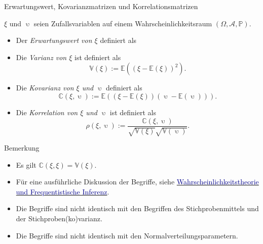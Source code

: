 \documentclass[
  8pt,
  ignorenonframetext,
]{beamer}
\providecommand{\tightlist}{%
  \setlength{\itemsep}{0pt}\setlength{\parskip}{0pt}}
\DeclareMathOperator*{\intinf}{\int_{-\infty}^{\infty}}
\DeclareMathOperator*{\ups}{\upsilon}
\begin{document}
\begin{frame}{Erwartungswert, Kovarianzmatrizen und
Korrelationsmatrizen}
\protect\hypertarget{erwartungswert-kovarianzmatrizen-und-korrelationsmatrizen}{}
\footnotesize
\begin{definition}
$\xi$ und $\ups$ seien Zufallsvariablen auf einem Wahrscheinlichkeitsraum $(\Omega, \mathcal{A}, \mathbb{P})$.
\begin{itemize}
\item Der \textit{Erwartungswert von $\xi$} definiert als
\begin{itemize}
\end{itemize}
\item Die \textit{Varianz von $\xi$} ist definiert als
\begin{equation}
\mathbb{V}(\xi) := \mathbb{E}\left((\xi - \mathbb{E}(\xi))^2\right).
\end{equation}
\item Die \textit{Kovarianz von $\xi$ und $\ups$} definiert als
\begin{equation}
\mathbb{C}(\xi,\ups) :=
\mathbb{E}\left(\left(\xi - \mathbb{E}(\xi) \right)\left(\ups - \mathbb{E}(\ups)\right)\right).
\end{equation}
\item Die \textit{Korrelation von $\xi$ und $\ups$} ist definiert als
\begin{equation}
\rho(\xi,\ups)
:= \frac{\mathbb{C}(\xi,\ups)}{\sqrt{\mathbb{V}(\xi)}\sqrt{\mathbb{V}(\ups)}}.
\end{equation}
\end{itemize}
\end{definition}
\vspace{-2mm}

Bemerkung \vspace{-2mm}

\begin{itemize}
\tightlist
\item
  Es gilt \(\mathbb{C}(\xi,\xi) = \mathbb{V}(\xi)\).
\item
  Für eine ausführliche Diskussion der Begriffe, siehe
  \href{https://bit.ly/3yT42Sj}{\textcolor{darkblue}{Wahrscheinlichkeitstheorie und Frequentistische Inferenz}}.
\item
  Die Begriffe sind nicht identisch mit den Begriffen des
  Stichprobenmittels und der Stichproben(ko)varianz.
\item
  Die Begriffe sind nicht identisch mit den Normalverteilungsparametern.
\end{itemize}
\end{frame}
\end{document}
